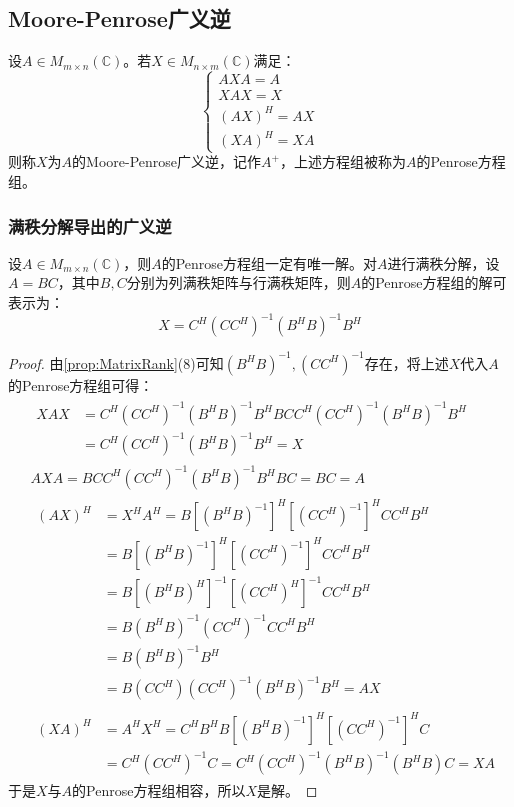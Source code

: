 \subsection{Moore-Penrose广义逆}
\begin{definition}
	设$A\in M_{m\times n}(\mathbb{C})$。若$X\in M_{n\times m}(\mathbb{C})$满足：
	\begin{equation*}
		\begin{cases}
			AXA=A \\
			XAX=X \\
			(AX)^H=AX \\
			(XA)^H=XA
		\end{cases}
	\end{equation*}
	则称$X$为$A$的Moore-Penrose广义逆，记作$A^+$，上述方程组被称为$A$的Penrose方程组。
\end{definition}
\subsubsection{满秩分解导出的广义逆}
\begin{theorem}
	设$A\in M_{m\times n}(\mathbb{C})$，则$A$的Penrose方程组一定有唯一解。对$A$进行满秩分解，设$A=BC$，其中$B,C$分别为列满秩矩阵与行满秩矩阵，则$A$的Penrose方程组的解可表示为：
	\begin{equation*}
		X=C^H(CC^H)^{-1}(B^HB)^{-1}B^H
	\end{equation*}
\end{theorem}
\begin{proof}
	由\cref{prop:MatrixRank}(8)可知$(B^HB)^{-1},(CC^H)^{-1}$存在，将上述$X$代入$A$的Penrose方程组可得：
	\begin{align*}
		&\begin{aligned}
			XAX
			&=C^H(CC^H)^{-1}(B^HB)^{-1}B^HBCC^H(CC^H)^{-1}(B^HB)^{-1}B^H \\
			&=C^H(CC^H)^{-1}(B^HB)^{-1}B^H=X
		\end{aligned} \\
		&AXA=BCC^H(CC^H)^{-1}(B^HB)^{-1}B^HBC=BC=A \\
		&\begin{aligned}
			(AX)^H
			&=X^HA^H=B[(B^HB)^{-1}]^H[(CC^H)^{-1}]^HCC^HB^H \\
			&=B[(B^HB)^{-1}]^H[(CC^H)^{-1}]^HCC^HB^H \\
			&=B[(B^HB)^H]^{-1}[(CC^H)^H]^{-1}CC^HB^H \\
			&=B(B^HB)^{-1}(CC^H)^{-1}CC^HB^H \\
			&=B(B^HB)^{-1}B^H \\
			&=B(CC^H)(CC^H)^{-1}(B^HB)^{-1}B^H=AX
		\end{aligned} \\
		&\begin{aligned}
			(XA)^H
			&=A^HX^H=C^HB^HB[(B^HB)^{-1}]^H[(CC^H)^{-1}]^HC \\
			&=C^H(CC^H)^{-1}C=C^H(CC^H)^{-1}(B^HB)^{-1}(B^HB)C=XA
		\end{aligned}
	\end{align*}
	于是$X$与$A$的Penrose方程组相容，所以$X$是解。
\end{proof}
